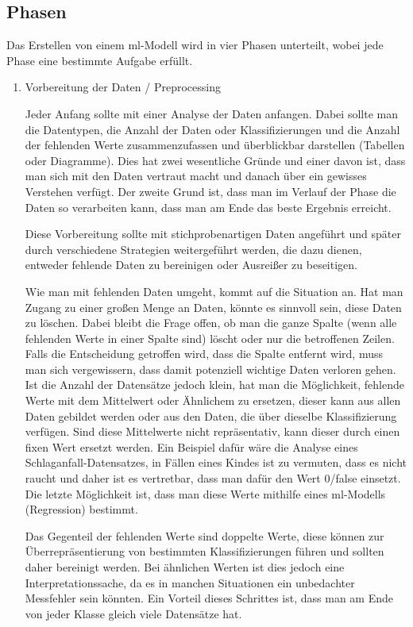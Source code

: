\subsection{Phasen}

Das Erstellen von einem \Gls{ml}-Modell wird in vier Phasen unterteilt, wobei jede Phase eine bestimmte Aufgabe erfüllt.

\begin{enumerate}
      \item Vorbereitung der Daten / Preprocessing

            Jeder Anfang sollte mit einer Analyse der Daten anfangen. Dabei sollte man die Datentypen, die Anzahl der Daten oder Klassifizierungen und die Anzahl der fehlenden Werte zusammenzufassen und überblickbar darstellen (Tabellen oder Diagramme). Dies hat zwei wesentliche Gründe und einer davon ist, dass man sich mit den Daten vertraut macht und danach über ein gewisses Verstehen verfügt. Der zweite Grund ist, dass man im Verlauf der Phase die Daten so verarbeiten kann, dass man am Ende das beste Ergebnis erreicht.

            Diese Vorbereitung sollte mit stichprobenartigen Daten angeführt und später durch verschiedene Strategien weitergeführt werden, die dazu dienen, entweder fehlende Daten zu bereinigen oder Ausreißer zu beseitigen.

            Wie man mit fehlenden Daten umgeht, kommt auf die Situation an.
            Hat man Zugang zu einer großen Menge an Daten, könnte es sinnvoll sein, diese Daten zu löschen. Dabei bleibt die Frage offen, ob man die ganze Spalte (wenn alle fehlenden Werte in einer Spalte sind) löscht oder nur die betroffenen Zeilen. Falls die Entscheidung getroffen wird, dass die Spalte entfernt wird, muss man sich vergewissern, dass damit potenziell wichtige Daten verloren gehen. Ist die Anzahl der Datensätze jedoch klein, hat man die Möglichkeit, fehlende Werte mit dem Mittelwert oder Ähnlichem zu ersetzen, dieser kann aus allen Daten gebildet werden oder aus den Daten, die über dieselbe Klassifizierung verfügen. Sind diese Mittelwerte nicht repräsentativ, kann dieser durch einen fixen Wert ersetzt werden. Ein Beispiel dafür wäre die Analyse eines Schlaganfall-Datensatzes, in Fällen eines Kindes ist zu vermuten, dass es nicht raucht und daher ist es vertretbar, dass man dafür den Wert 0/false einsetzt. Die letzte Möglichkeit ist, dass man diese Werte mithilfe eines \gls{ml}-Modells (Regression) bestimmt. \cite{MLkg}

            Das Gegenteil der fehlenden Werte sind doppelte Werte, diese können zur Überrepräsentierung von bestimmten Klassifizierungen führen und sollten daher bereinigt werden. Bei ähnlichen Werten ist dies jedoch eine Interpretationssache, da es in manchen Situationen ein unbedachter Messfehler sein könnten. Ein Vorteil dieses Schrittes ist, dass man am Ende von jeder Klasse gleich viele Datensätze hat.


\end{enumerate}

